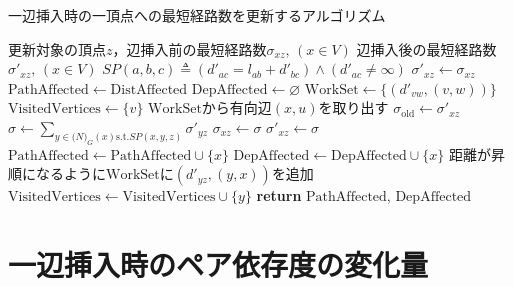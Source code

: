 \begin{algorithm}[H]
  \caption{一辺挿入時の一頂点への最短経路数を更新するアルゴリズム}
  \label{algo:update-sigma-on-insert}
  \begin{algorithmic}[1]
    \Require 更新対象の頂点$z$，辺挿入前の最短経路数$\sigma_{xz},\,(x\in V)$
    \Ensure 辺挿入後の最短経路数$\sigma'_{xz},\,(x\in V)$
    \State $SP(a,b,c)\triangleq(d'_{ac}=l_{ab}+d'_{bc})\land(d'_{ac}\neq\infty)$
    \State $\sigma'_{xz}\gets\sigma_{xz}$
    \State $\mathrm{PathAffected}\gets\mathrm{DistAffected}$
    \State $\mathrm{DepAffected}\gets\varnothing$
    \State $\mathrm{WorkSet}\gets\{(d'_{vw}, (v, w))\}$
    \State $\mathrm{VisitedVertices}\gets\{v\}$
    \State $\mathrm{WorkSet}$から有向辺$(x,u)$を取り出す
    \State $\sigma_{\mathrm{old}}\gets\sigma'_{xz}$
    \State $\sigma\gets\sum_{y\in \mathcal(N)_G(x)\mathrm{s.t.}SP(x,y,z)}\sigma'_{yz}$
    \State $\sigma_{xz}\gets\sigma$
    \State $\sigma'_{xz}\gets\sigma$
    \State $\mathrm{PathAffected}\gets\mathrm{PathAffected}\cup\{x\}$
    \State $\mathrm{DepAffected}\gets\mathrm{DepAffected}\cup\{x\}$
    \State 距離が昇順になるように$\mathrm{WorkSet}$に$(d'_{yz},(y,x))$を追加
    \State $\mathrm{VisitedVertices}\gets\mathrm{VisitedVertices}\cup\{y\}$
    \EndFor
    \EndIf
    \EndWhile
    \State \textbf{return} $\mathrm{PathAffected}$, $\mathrm{DepAffected}$
    \EndProcedure
  \end{algorithmic}
\end{algorithm}

\section{一辺挿入時のペア依存度の変化量}
\label{sect:update-pd-on-insert}

